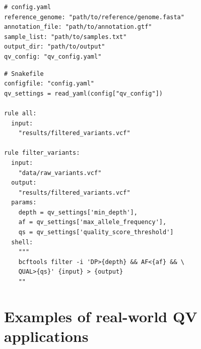 \begin{tcolorbox}[
    breakable,  %
    colback=white!0,  %
    colframe=black,  %
    boxrule=1pt,  %
    arc=1mm,  %
    outer arc=1mm,
     title=\textbf{\refstepcounter{myboxcounter}\label{box:qv_variables_example_workflow2}Box \themyboxcounter: Example worflow manager - yaml}
]
\begin{verbatim}
# config.yaml
reference_genome: "path/to/reference/genome.fasta"
annotation_file: "path/to/annotation.gtf"
sample_list: "path/to/samples.txt"
output_dir: "path/to/output"
qv_config: "qv_config.yaml"
\end{verbatim}
\end{tcolorbox}



\begin{tcolorbox}[
    breakable,  %
    colback=white!0,  %
    colframe=black,  %
    boxrule=1pt,  %
    arc=1mm,  %
    outer arc=1mm,
     title=\textbf{\refstepcounter{myboxcounter}\label{box:qv_variables_example_workflow3}Box \themyboxcounter: Example worflow manager - python}
]
\begin{verbatim}
# Snakefile
configfile: "config.yaml"
qv_settings = read_yaml(config["qv_config"])

rule all:
  input:
    "results/filtered_variants.vcf"

rule filter_variants:
  input:
    "data/raw_variants.vcf"
  output:
    "results/filtered_variants.vcf"
  params:
    depth = qv_settings['min_depth'],
    af = qv_settings['max_allele_frequency'],
    qs = qv_settings['quality_score_threshold']
  shell:
    """
    bcftools filter -i 'DP>{depth} && AF<{af} && \
    QUAL>{qs}' {input} > {output}
    ""
\end{verbatim}
\end{tcolorbox}

\section{Examples of real-world QV applications}

